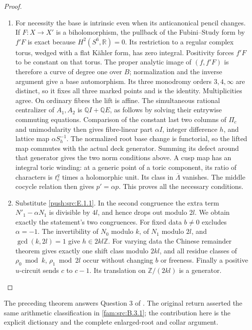 \begin{proof}
\begin{enumerate}[label=\arabic*.,leftmargin=*]
\item For necessity the base is intrinsic even when its anticanonical
pencil changes.  If $F:X\to X'$ is a biholomorphism, the pullback
of the Fubini--Study form by $f'F$ is exact because
$H^2(S^6,\mathbb R)=0$.  Its restriction to a regular complex torus,
wedged with a flat K\"ahler form, has zero integral.  Positivity
forces $f'F$ to be constant on that torus.  The proper analytic
image of $(f,f'F)$ is therefore a curve of degree one over $B$;
normalization and the inverse argument give a base automorphism.
Its three monodromy orders $3,4,\infty$ are distinct, so it fixes
all three marked points and is the identity.  Multiplicities agree.
On ordinary fibres the lift is affine.  The simultaneous rational
centralizer of $A_1,A_2$ is $\mathbb Q I+\mathbb Q E$, as follows
by solving their entrywise commuting equations.  Comparison of the
constant last two columns of $\Pi_c$ and unimodularity then gives
fibre-linear part $\alpha I$, integer difference $h$, and lattice
map $\alpha S_h^{-1}$.  The normalized root base change is
functorial, so the lifted map commutes with the actual deck
generator.  Summing its defect around that generator gives the
two norm conditions above.  A cusp map has an integral toric
winding: at a generic point of a toric component, its ratio of
characters is $t_c^q$ times a holomorphic unit.  Its class in
$\overline\Lambda$ vanishes.  The middle cocycle relation then
gives $p'=\alpha p$.  This proves all the necessary conditions.

\item Substitute \ref{push:src:E.1.1}.  In the second congruence the extra term
$N'_1-\alpha N_1$ is divisible by $4l$, and hence drops out
modulo $2l$.  We obtain exactly the statement's two congruences.
For fixed data $b\ne0$ excludes $\alpha=-1$.
The invertibility of $N_0$ modulo $k$, of $N_1$ modulo $2l$, and
$\gcd(k,2l)=1$ give $h\in2kl\mathbb Z$.
For varying data the Chinese remainder theorem gives exactly one
shift class modulo $2kl$, and all residue classes of
$\rho_0\bmod k$, $\rho_1\bmod2l$ occur without changing $b$ or
freeness.  Finally a positive $u$-circuit sends $c$ to $c-1$.
Its translation on $\mathbb Z/(2kl)$ is a generator.
\end{enumerate}
\end{proof}

The preceding theorem answers Question 3 of
\cite[Section 1.1]{ViaclovskyLog2026}.  The original return asserted the
same arithmetic classification in \cref{fam:src:B.3.1}; the contribution here is
the explicit dictionary and the complete enlarged-root and collar
argument.

